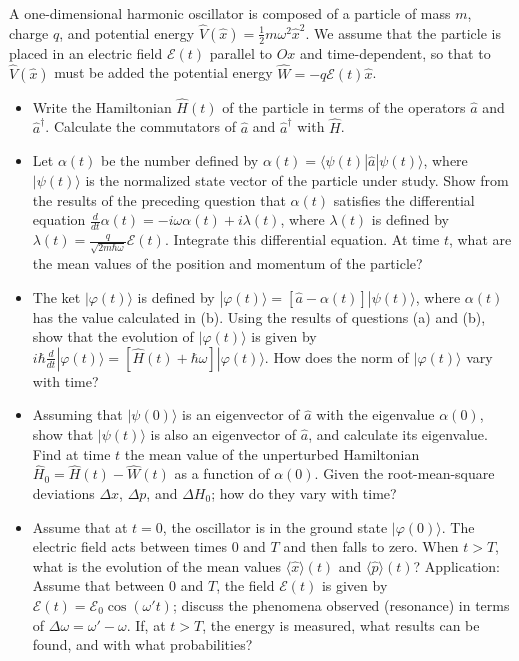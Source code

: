\documentclass[12pt,a4paper]{article}
\newenvironment{problem}[2][Problem]{\begin{trivlist}
\item[\hskip \labelsep {\bfseries #1}\hskip \labelsep {\bfseries #2.}]}{\end{trivlist}}
\begin{document}
\begin{problem}{4}
[C-T Exercise 5-6] A one-dimensional harmonic oscillator is composed of a particle of mass $m$, charge $q$, and potential energy $\hat{V}(\hat{x})=\frac{1}{2}m\omega^2\hat{x}^2$. We assume that the particle is placed in an electric field $\mathcal{E}(t)$ parallel to $Ox$ and time-dependent, so that to $\hat{V}(\hat{x})$ must be added the potential energy $\hat{W}=-q\mathcal{E}(t)\hat{x}$.
\begin{itemize}
\item[(a)] Write the Hamiltonian $\hat{H}(t)$ of the particle in terms of the operators $\hat{a}$ and $\hat{a}^{\dagger}$. Calculate the commutators of $\hat{a}$ and $\hat{a}^{\dagger}$ with $\hat{H}$.
\item[(b)] Let $\alpha(t)$ be the number defined by $\alpha(t)=\langle\psi(t)|\hat{a}|\psi(t)\rangle$, where $|\psi(t)\rangle$ is the normalized state vector of the particle under study. Show from the results of the preceding question that $\alpha(t)$ satisfies the differential equation $\frac{d}{dt}\alpha(t)=-i\omega\alpha(t)+i\lambda(t)$, where $\lambda(t)$ is defined by $\lambda(t)=\frac{q}{\sqrt{2m\hbar\omega}}\mathcal{E}(t)$. Integrate this differential equation. At time $t$, what are the mean values of the position and momentum of the particle?
\item[(c)] The ket $|\varphi(t)\rangle$ is defined by $|\varphi(t)\rangle=[\hat{a}-\alpha(t)]|\psi(t)\rangle$, where $\alpha(t)$ has the value calculated in (b). Using the results of questions (a) and (b), show that the evolution of $|\varphi(t)\rangle$ is given by $i\hbar\frac{d}{dt}|\varphi(t)\rangle=[\hat{H}(t)+\hbar\omega]|\varphi(t)\rangle$. How does the norm of $|\varphi(t)\rangle$ vary with time?
\item[(d)] Assuming that $|\psi(0)\rangle$ is an eigenvector of $\hat{a}$ with the eigenvalue $\alpha(0)$, show that $|\psi(t)\rangle$ is also an eigenvector of $\hat{a}$, and calculate its eigenvalue. Find at time $t$ the mean value of the unperturbed Hamiltonian $\hat{H}_0=\hat{H}(t)-\hat{W}(t)$ as a function of $\alpha(0)$. Given the root-mean-square deviations $\Delta x$, $\Delta p$, and $\Delta H_0$; how do they vary with time?
\item[(e)] Assume that at $t=0$, the oscillator is in the ground state $|\varphi(0)\rangle$. The electric field acts between times $0$ and $T$ and then falls to zero. When $t>T$, what is the evolution of the mean values $\langle\hat{x}\rangle(t)$ and $\langle\hat{p}\rangle(t)$? Application: Assume that between $0$ and $T$, the field $\mathcal{E}(t)$ is given by $\mathcal{E}(t)=\mathcal{E}_0\cos(\omega't)$; discuss the phenomena observed (resonance) in terms of $\Delta\omega=\omega'-\omega$. If, at $t>T$, the energy is measured, what results can be found, and with what probabilities?
\end{itemize}
\end{problem}
\end{document}
